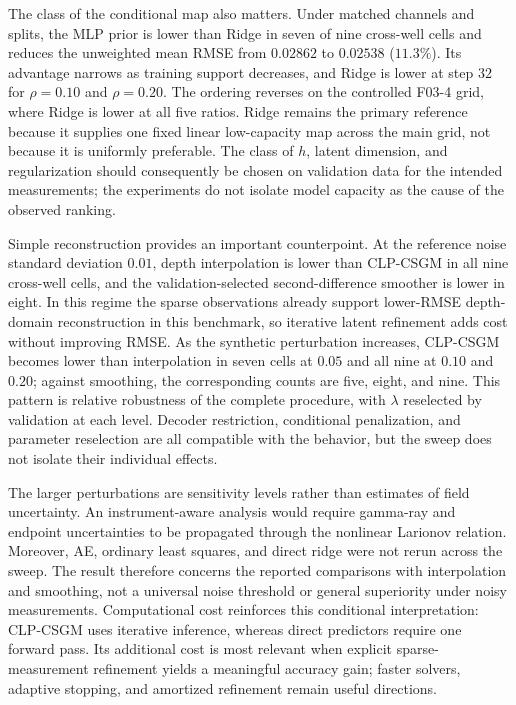 The class of the conditional map also matters. Under matched channels and
splits, the MLP prior is lower than Ridge in seven of nine cross-well cells
and reduces the unweighted mean RMSE from $0.02862$ to $0.02538$ ($11.3\%$).
Its advantage narrows as training support decreases, and Ridge is lower at
step $32$ for $\rho=0.10$ and $\rho=0.20$. The ordering reverses on the
controlled F03-4 grid, where Ridge is lower at all five ratios. Ridge remains
the primary reference because it supplies one fixed linear low-capacity map
across the main grid, not because it is uniformly preferable. The class of
$h$, latent dimension, and regularization should consequently be chosen on
validation data for the intended measurements; the experiments do not isolate
model capacity as the cause of the observed ranking.

Simple reconstruction provides an important counterpoint. At the reference
noise standard deviation $0.01$, depth interpolation is lower than CLP-CSGM
in all nine cross-well cells, and the validation-selected second-difference
smoother is lower in eight. In this regime the sparse observations already
support lower-RMSE depth-domain reconstruction in this benchmark, so
iterative latent refinement adds cost without improving RMSE. As the
synthetic perturbation increases,
CLP-CSGM becomes lower than interpolation in seven cells at $0.05$ and all
nine at $0.10$ and $0.20$; against smoothing, the corresponding counts are
five, eight, and nine. This pattern is relative robustness of the complete
procedure, with $\lambda$ reselected by validation at each level. Decoder
restriction, conditional penalization, and parameter reselection are all
compatible with the behavior, but the sweep does not isolate their individual
effects.

The larger perturbations are sensitivity levels rather than estimates of
field uncertainty. An instrument-aware analysis would require gamma-ray and
endpoint uncertainties to be propagated through the nonlinear Larionov
relation. Moreover, AE, ordinary least squares, and direct ridge were not
rerun across the sweep. The result therefore concerns the reported
comparisons with interpolation and smoothing, not a universal noise threshold
or general superiority under noisy measurements. Computational cost reinforces
this conditional interpretation: CLP-CSGM uses iterative inference, whereas
direct predictors require one forward pass. Its additional cost is most
relevant when explicit sparse-measurement refinement yields a meaningful
accuracy gain; faster solvers, adaptive stopping, and amortized refinement
remain useful directions.

